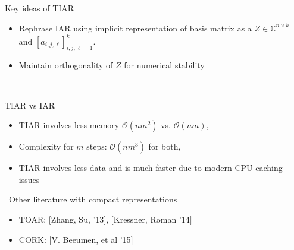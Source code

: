 \documentclass{beamer}
\newcommand{\RR}{\mathbb{R}}
\newcommand{\CC}{\mathbb{C}}
\newcommand{\mycite}[1]{$[$#1$]$}
\begin{document}
\begin{frame}
\begin{block}{Key ideas of TIAR}
  \begin{itemize}
    \item Rephrase IAR using implicit representation
      of basis matrix as a $Z\in\CC^{n\times k}$ and $[a_{i,j,\ell}]_{i,j,\ell=1}^k$.
    \item Maintain orthogonality of $Z$ for numerical stability\
  \end{itemize}
\end{block}\
\begin{block}{TIAR vs IAR}
 \begin{itemize}
  \item TIAR involves less memory $\mathcal{O}(nm^2)$ vs. $\mathcal{O}(nm)$, 	\\
  \item Complexity for $m$ steps: $\mathcal{O}(nm^3)$ for both,			\\
  \item TIAR involves less data and is much faster
	  due to modern CPU-caching issues
 \end{itemize}
\end{block}\
{Other literature with compact representations}
  \begin{itemize}
    \item TOAR: \mycite{Zhang, Su, '13}, \mycite{Kressner, Roman '14}
    \item CORK: \mycite{V. Beeumen, et al '15}
  \end{itemize}
\end{frame}


\end{document}
